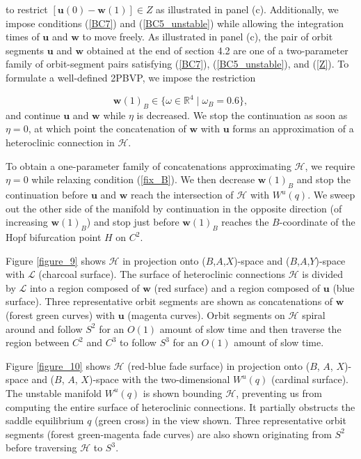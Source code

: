 \documentclass{ws-ijbc}
\begin{document}
\noindent
to restrict $[\mathbf{u}(0) -\mathbf{w}(1)] \in Z$ as illustrated in panel (c).  Additionally, we impose conditions (\ref{BC7}) and (\ref{BC5_unstable}) while allowing the integration times of $\mathbf{u}$ and $\mathbf{w}$ to move freely.  As illustrated in panel (c), the pair of orbit segments $\mathbf{u}$ and $\mathbf{w}$ obtained at the end of section 4.2 are one of a two-parameter family of orbit-segment pairs satisfying (\ref{BC7}), (\ref{BC5_unstable}), and (\ref{Z}).  To formulate a well-defined 2PBVP, we impose the restriction

\begin{equation}
\mathbf{w}(1)_B \in \{ \omega \in \mathbb{R}^4 \; | \; \omega_B = 0.6 \},
\label{fix_B}
\end{equation}  
\noindent
and continue $\mathbf{u}$ and $\mathbf{w}$ while $\eta$ is decreased.  We stop the continuation as soon as $\eta = 0$, at which point the concatenation of $\mathbf{w}$ with $\mathbf{u}$ forms an approximation of a heteroclinic connection in $\mathscr{H}$.

To obtain a one-parameter family of concatenations approximating $\mathscr{H}$, we require $\eta = 0$ while relaxing condition (\ref{fix_B}).  We then decrease $\mathbf{w}(1)_B$ and stop the continuation before $\mathbf{u}$ and $\mathbf{w}$ reach the intersection of $\mathscr{H}$ with $W^u(q)$.  We sweep out the other side of the manifold by continuation in the opposite direction (of increasing $\mathbf{w}(1)_B$) and stop just before $\mathbf{w}(1)_B$ reaches the $B$-coordinate of the Hopf bifurcation point $H$ on $C^2$.

Figure \ref{figure_9} shows $\mathscr{H}$ in projection onto ($B$,$A$,$X$)-space and ($B$,$A$,$Y$)-space with $\mathscr{L}$ (charcoal surface).  The surface of heteroclinic connections $\mathscr{H}$ is divided by $\mathscr{L}$ into a region composed of $\mathbf{w}$ (red surface) and a region composed of $\mathbf{u}$ (blue surface).  Three representative orbit segments are shown as concatenations of $\mathbf{w}$ (forest green curves) with $\mathbf{u}$ (magenta curves).  Orbit segments on $\mathscr{H}$ spiral around and follow $S^2$ for an $O(1)$ amount of slow time and then traverse the region between $C^2$ and $C^3$ to follow $S^3$ for an $O(1)$ amount of slow time.

Figure \ref{figure_10} shows $\mathscr{H}$ (red-blue fade surface) in projection onto ($B$, $A$, $X$)-space and ($B$, $A$, $X$)-space with the two-dimensional $W^u(q)$ (cardinal surface).  The unstable manifold $W^u(q)$ is shown bounding $\mathscr{H}$, preventing us from computing the entire surface of heteroclinic connections.  It partially obstructs the saddle equilibrium $q$ (green cross) in the view shown.  Three representative orbit segments (forest green-magenta fade curves) are also shown originating from $S^2$ before traversing $\mathscr{H}$ to $S^3$.
\end{document}
